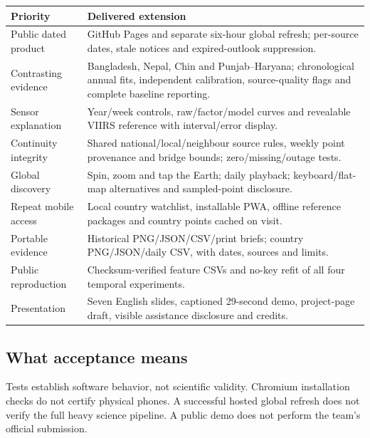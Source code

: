 \begin{tabularx}{\linewidth}{@{}L{36mm}Y@{}}
\toprule\textbf{Priority} & \textbf{Delivered extension}\\\midrule
Public dated product & GitHub Pages and separate six-hour global refresh; per-source dates, stale notices and expired-outlook suppression.\\
Contrasting evidence & Bangladesh, Nepal, Chin and Punjab--Haryana; chronological annual fits, independent calibration, source-quality flags and complete baseline reporting.\\
Sensor explanation & Year/week controls, raw/factor/model curves and revealable VIIRS reference with interval/error display.\\
Continuity integrity & Shared national/local/neighbour source rules, weekly point provenance and bridge bounds; zero/missing/outage tests.\\
Global discovery & Spin, zoom and tap the Earth; daily playback; keyboard/flat-map alternatives and sampled-point disclosure.\\
Repeat mobile access & Local country watchlist, installable PWA, offline reference packages and country points cached on visit.\\
Portable evidence & Historical PNG/JSON/CSV/print briefs; country PNG/JSON/daily CSV, with dates, sources and limits.\\
Public reproduction & Checksum-verified feature CSVs and no-key refit of all four temporal experiments.\\
Presentation & Seven English slides, captioned 29-second demo, project-page draft, visible assistance disclosure and credits.\\\bottomrule
\end{tabularx}

\subsection{What acceptance means}
Tests establish software behavior, not scientific validity. Chromium installation checks do not certify physical phones. A successful hosted global refresh does not verify the full heavy science pipeline. A public demo does not perform the team's official submission.


